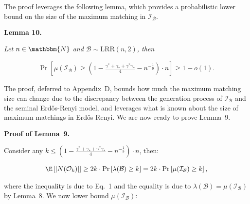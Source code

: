 \documentclass[10pt,a4paper]{article}
\begin{document}



The proof leverages the following lemma, which provides a probabilistic lower bound on the size of the maximum matching in $\mathcal{I}_{\mathcal{B}}$.\par





\par\medskip\noindent\textbf{\textbf{Lemma 10}\textbf{.}}\par



\emph{Let $n\in\mathbbm{N}$ and $\mathcal{B}\sim\text{{LRR}}\left(n,2\right)$, then}\par


\[\begin{gathered}
\Pr\left[\mu(\mathcal{I}_{\mathcal{B}})\geq\left(1-\frac{\gamma^{*}+\gamma_{*}+\gamma^{*}\gamma_{*}}{4}-n^{-\frac{1}{9}}\right)\cdot n\right]\geq 1-o(1).
\end{gathered}\]






The proof, deferred to Appendix D, bounds how much the maximum matching size can change due to the discrepancy between the generation process of $\mathcal{I}_{\mathcal{B}}$ and the seminal Erdős-Renyi model, and leverages what is known about the size of maximum matchings in Erdős-Renyi. We are now ready to prove Lemma 9.\par




\par\medskip\noindent\textbf{Proof of Lemma 9.}\par



Consider any $k\leq\left(1-\frac{\gamma^{*}+\gamma_{*}+\gamma^{*}\gamma_{*}}{4}-n^{-\frac{1}{9}}\right)\cdot n$, then:\par


\[\begin{gathered}
\displaystyle\E\left[|N(\mathcal{O}_{k})|\right]\geq 2k\cdot\Pr\left[\lambda(\mathcal{B})\geq k\right]=2k\cdot\Pr\left[\mu(\mathcal{I}_{\mathcal{B}})\geq k\right],
\end{gathered}\]


where the inequality is due to Eq. 1 and the equality is due to $\lambda(\mathcal{B})=\mu(\mathcal{I}_{\mathcal{B}})$ by Lemma 8.
We now lower bound $\mu(\mathcal{I}_{\mathcal{B}})$:\par
\end{document}
